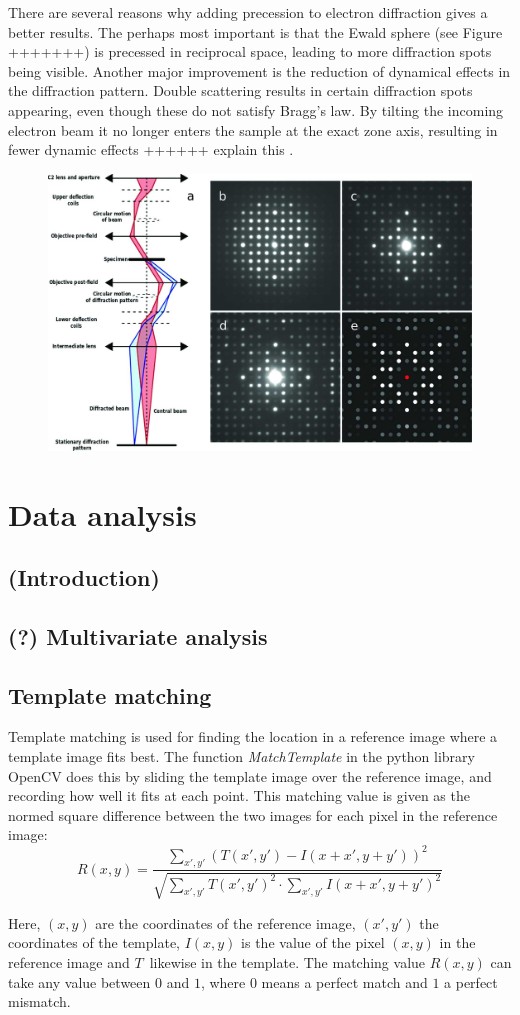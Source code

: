 There are several reasons why adding precession to electron diffraction gives a better results. The perhaps most important is that the Ewald sphere (see Figure +++++++) is precessed in reciprocal space, leading to more diffraction spots being visible. Another major improvement is the reduction of dynamical effects in the diffraction pattern. Double scattering results in certain diffraction spots appearing, even though these do not satisfy Bragg's law. By tilting the incoming electron beam it no longer enters the sample at the exact zone axis, resulting in fewer dynamic effects  ++++++ explain this \cite{new-zeta-method}.

\begin{figure}
\centering
\includegraphics[width=0.7\linewidth]{fig/precession}
\caption{}
\label{fig:precession}
\end{figure}


\section{Data analysis}
	\subsection{(Introduction)}
	\subsection{(?) Multivariate analysis}
	\subsection{Template matching}
Template matching is used for finding the location in a reference image where a template image fits best. The function \textit{MatchTemplate} in the python library OpenCV does this by sliding the template image over the reference image, and recording how well it fits at each point. This matching value is given as the normed square difference between the two images for each pixel in the reference image:
\begin{equation}
 R(x,y)= \frac{\sum_{x',y'} (T(x',y')-I(x+x',y+y'))^2}{\sqrt{\sum_{x',y'}T(x',y')^2 \cdot \sum_{x',y'} I(x+x',y+y')^2}}
 \label{eq:matching value}
\end{equation}

Here, $(x,y)$ are the coordinates of the reference image, $(x',y')$ the coordinates of the template, $I(x,y)$ is the value of the pixel $(x,y)$ in the reference image and $T$ likewise in the template. The matching value $R(x,y)$ can take any value between $0$ and $1$, where $0$ means a perfect match and $1$ a perfect mismatch.

